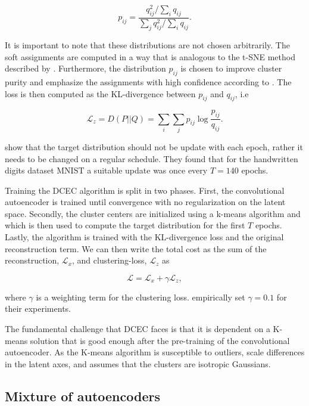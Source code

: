 \begin{equation}
p_{ij} = \frac{q_{ij}^2/\sum_i q_{ij}}{\sum_j q_{ij}^2/\sum_i q_{ij}}.
\end{equation}

\noindent It is important to note that these distributions are not chosen arbitrarily. The soft assignments are computed in a way that is analogous to the t-SNE method described by \citet{VanDerMaaten2008}. Furthermore, the distribution $p_{ij}$ is chosen to improve cluster purity and emphasize the assignments with high confidence according to \cite{Xie2016}. The loss is then computed as the KL-divergence between $p_{ij}$ and $q_{ij}$, i.e

\begin{equation}
\mathcal{L}_z = D(P ||Q ) = \sum_i \sum_j p_{ij} \log \frac{p_{ij}}{q_{ij}}.
\end{equation} 

\noindent \citet{Guo2017} show that the target distribution should not be update with each epoch, rather it needs to be changed on a regular schedule. They found that for the handwritten digits dataset MNIST a suitable update was once every $T=140$ epochs. 

Training the DCEC algorithm is split in two phases. First, the convolutional autoencoder is trained until convergence with no regularization on the latent space. Secondly, the cluster centers are initialized using a k-means algorithm and which is then used to compute the target distribution for the first $T$ epochs. Lastly, the algorithm is trained with the KL-divergence loss and the original reconstruction term. We can then write the total cost as the sum of the reconstruction, $\mathcal{L}_x$, and clustering-loss, $\mathcal{L}_z$ as 

\begin{equation}
\mathcal{L} = \mathcal{L}_x + \gamma \mathcal{L}_z,
\end{equation}

\noindent where $\gamma$ is a weighting term for the clustering loss. \cite{Guo2017} empirically set $\gamma=0.1$ for their experiments. 

The fundamental challenge that DCEC faces is that it is dependent on a K-means solution that is good enough after the pre-training of the convolutional autoencoder. As the K-means algorithm is susceptible to outliers, scale differences in the latent axes,  and assumes that the clusters are isotropic Gaussians. 

\subsection{Mixture of autoencoders}


